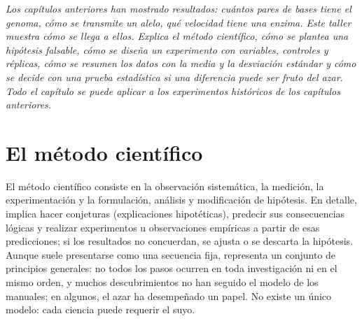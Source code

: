 \documentclass{book}
\begin{document}
\noindent\textit{Los capítulos anteriores han mostrado resultados: cuántos pares de bases tiene el genoma, cómo se transmite un alelo, qué velocidad tiene una enzima. Este taller muestra cómo se llega a ellos. Explica el método científico, cómo se plantea una hipótesis falsable, cómo se diseña un experimento con variables, controles y réplicas, cómo se resumen los datos con la media y la desviación estándar y cómo se decide con una prueba estadística si una diferencia puede ser fruto del azar. Todo el capítulo se puede aplicar a los experimentos históricos de los capítulos anteriores.}


\section{El método científico}

El método científico consiste en la observación sistemática, la medición, la experimentación y la formulación, análisis y modificación de hipótesis. En detalle, implica hacer conjeturas (explicaciones hipotéticas), predecir sus consecuencias lógicas y realizar experimentos u observaciones empíricas a partir de esas predicciones; si los resultados no concuerdan, se ajusta o se descarta la hipótesis. Aunque suele presentarse como una secuencia fija, representa un conjunto de principios generales: no todos los pasos ocurren en toda investigación ni en el mismo orden, y muchos descubrimientos no han seguido el modelo de los manuales; en algunos, el azar ha desempeñado un papel. No existe un único modelo: cada ciencia puede requerir el suyo.

\end{document}
